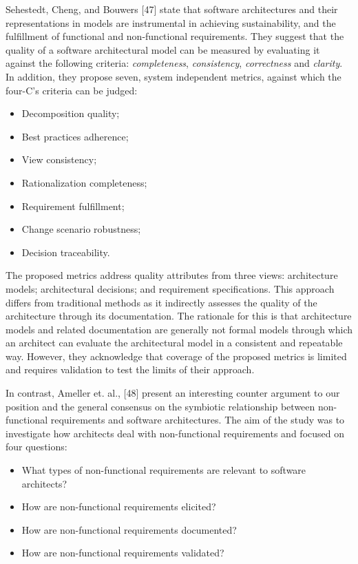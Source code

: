 \documentclass[preprint,12pt,authoryear]{elsarticle}
\begin{document}
Sehestedt, Cheng, and Bouwers [47] state that software architectures
and their representations in models are instrumental in achieving
sustainability, and the fulfillment of functional and non-functional
requirements. They suggest that the quality of a software
architectural model can be measured by evaluating it against the
following criteria: {\emph{completeness}}, {\emph{consistency}},
{\emph{correctness}} and {\emph{clarity}}. In addition, they propose
seven, system independent metrics, against which the four-C's criteria
can be judged:

\begin{itemize}
\item Decomposition quality;
\item Best practices adherence;
\item View consistency;
\item Rationalization completeness;
\item Requirement fulfillment;
\item Change scenario robustness;
\item Decision traceability.
\end{itemize}

The proposed metrics address quality attributes from three views:
architecture models; architectural decisions; and requirement
specifications. This approach differs from traditional methods as it
indirectly assesses the quality of the architecture through its
documentation. The rationale for this is that architecture models and
related documentation are generally not formal models through which an
architect can evaluate the architectural model in a consistent and
repeatable way. However, they acknowledge that coverage of the
proposed metrics is limited and requires validation to test the limits
of their approach.

In contrast, Ameller et. al., [48] present an interesting counter
argument to our position and the general consensus on the symbiotic
relationship between non-functional requirements and software
architectures. The aim of the study was to investigate how architects
deal with non-functional requirements and focused on four questions:

\begin{itemize}
\item What types of non-functional requirements are relevant to software architects?
\item How are non-functional requirements elicited?
\item How are non-functional requirements documented?
\item How are non-functional requirements validated?
\end{itemize}
\end{document}
